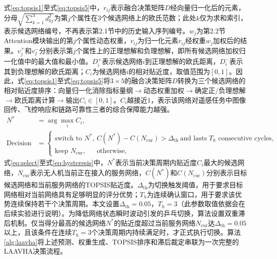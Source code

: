 \documentclass[10pt,a4paper]{ctexart}
\begin{document}
式\eqref{eq:topsis1}至式\eqref{eq:topsis5}中，$r_{ij}$表示融合决策矩阵$D$经向量归一化后的元素，分母$\sqrt{\sum_{k=1}^{3}d_{kj}^{2}}$为第$j$个属性在3个候选网络上的欧氏范数；此处$k$仅为求和索引，表示候选网络编号，不再表示第2.1节中的历史输入序列编号。$w_j$为第2.2节Attention模块输出的第$j$个属性动态权重，$v_{ij}$为归一化元素$r_{ij}$经权重$w_j$加权后的结果。$v_j^+$和$v_j^-$分别表示第$j$个属性上的正理想解和负理想解，即所有候选网络加权归一化值中的最大值和最小值。$D_i^+$表示候选网络$i$到正理想解的欧氏距离，$D_i^-$表示其到负理想解的欧氏距离；$C_i$为候选网络$i$的相对贴近度，取值范围为$[0,1]$。因此，式\eqref{eq:topsis1}至式\eqref{eq:topsis5}将$3\times5$的融合决策矩阵$D$转换为三个候选网络的相对贴近度排序：向量归一化消除指标量纲$\rightarrow$动态权重加权$\rightarrow$确定正/负理想解$\rightarrow$欧氏距离计算$\rightarrow$输出$C_i\in[0,1]$。$C_i$越接近1，表示该网络对遥感任务中图像回传、飞控响应和链路可靠性三者的综合保障能力越强。
\begin{align}
N^* &= \arg\max_i C_i, \label{eq:select}\\
\mathrm{Decision} &=
\begin{cases}
\text{switch to }N^*, & C(N^*)-C(N_{\mathrm{cur}})>\Delta_{\mathrm{th}}\ \text{and lasts }T_h\text{ consecutive cycles},\\
\text{keep }N_{\mathrm{cur}}, & \text{otherwise},
\end{cases} \label{eq:hysteresis}
\end{align}
式\eqref{eq:select}至式\eqref{eq:hysteresis}中，$N^*$表示当前决策周期内贴近度$C_i$最大的候选网络，$N_{\mathrm{cur}}$表示无人机当前正在接入的服务网络，$C(N^*)$和$C(N_{\mathrm{cur}})$分别表示目标候选网络和当前服务网络的TOPSIS贴近度。$\Delta_{\mathrm{th}}$为切换触发阈值，用于要求目标网络相对当前网络具有足够明显的评分优势；$T_h$为连续确认窗口，用于要求该优势连续保持若干个决策周期。本文设置$\Delta_{\mathrm{th}}=0.05$，$T_h=3$（此参数取值依据会在后续实验进行说明）。为降低网络状态瞬时波动引发的乒乓切换，算法设置双重滞后机制。仅当得分最高的候选网络$N^*$的贴近度超过当前服务网络$N_{\mathrm{cur}}$达$\Delta_{\mathrm{th}}=0.05$以上，且该条件在连续$T_h=3$个决策周期内持续满足时，才正式执行切换。算法\ref{alg:laavha}将上述预测、权重生成、TOPSIS排序和滞后裁定串联为一次完整的LAAVHA决策流程。
\end{document}
